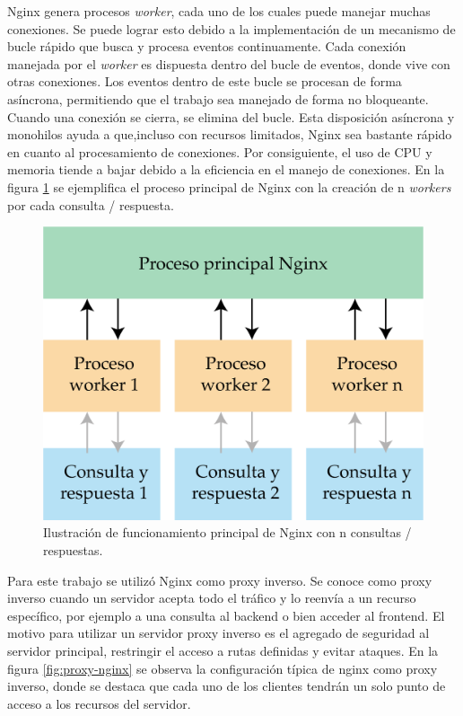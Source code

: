Nginx genera procesos \textit{worker}, cada uno de los cuales puede manejar muchas conexiones. Se puede lograr esto debido a la implementación de un mecanismo de bucle rápido que busca y procesa eventos continuamente. Cada conexión manejada por el \textit{worker} es dispuesta dentro del bucle de eventos, donde vive con otras conexiones. Los eventos dentro de este bucle se procesan de forma asíncrona, permitiendo que el trabajo sea manejado de forma no bloqueante. Cuando una conexión se cierra, se elimina del bucle. Esta disposición asíncrona y monohilos ayuda a que,incluso con recursos limitados, Nginx sea bastante rápido en cuanto al procesamiento de conexiones. Por consiguiente, el uso de CPU y memoria tiende a bajar debido a la eficiencia en el manejo de conexiones. En la figura  \ref{fig:worker-nginx} se ejemplifica el proceso principal de Nginx con la creación de n \textit{workers} por cada consulta / respuesta.

\begin{figure}[htpb]
	\centering
	\includegraphics[scale=.7]{./Figures/worker-nginx.png}
	\caption[Proceso principal Nginx ]{Ilustración de funcionamiento principal de Nginx con n consultas / respuestas.}
	\label{fig:worker-nginx}
\end{figure}

Para este trabajo se utilizó Nginx como proxy inverso. Se conoce como proxy inverso cuando un servidor acepta todo el tráfico y lo reenvía a un recurso específico, por ejemplo a una consulta al backend o bien acceder al frontend. El motivo para utilizar un servidor proxy inverso es el agregado de seguridad al servidor principal,  restringir el acceso a rutas definidas y evitar ataques. En la figura \ref{fig:proxy-nginx}  se observa la configuración típica de nginx como proxy inverso, donde se destaca que cada uno de los clientes tendrán un solo punto de acceso a los recursos del servidor. 

